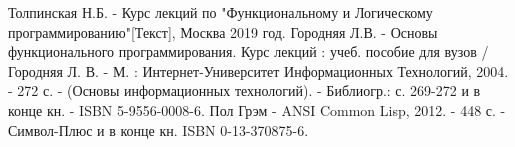 \newpage
{}

\begin{thebibliography}{}
      Толпинская Н.Б.  -  Курс лекций по "Функциональному и Логическому программированию"[Текст], Москва 2019 год.
      Городняя Л.В.  -  Основы функционального программирования. Курс лекций : учеб. пособие для вузов / Городняя Л. В. - М. : Интернет-Университет Информационных Технологий, 2004. - 272 с. - (Основы информационных технологий). - Библиогр.: с. 269-272 и в конце кн. - ISBN 5-9556-0008-6.
     Пол Грэм - ANSI Common Lisp, 2012. - 448 с. - Символ-Плюс и в конце кн. ISBN 0-13-370875-6.
\end{thebibliography}
